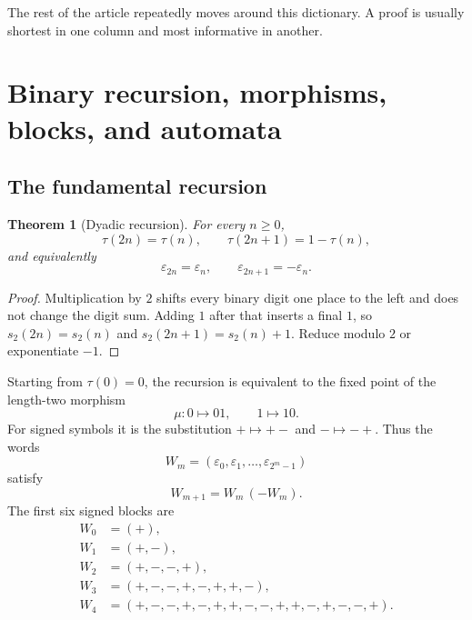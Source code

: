 \documentclass[11pt,oneside]{article}
\newtheorem{theorem}{Theorem}[section]
\theoremstyle{definition}
\theoremstyle{remark}
\newcommand{\bitsum}{s_2}
\newcommand{\eps}{\varepsilon}
\begin{document}
The rest of the article repeatedly moves around this dictionary.  A proof is
usually shortest in one column and most informative in another.

\section{Binary recursion, morphisms, blocks, and automata}

\subsection{The fundamental recursion}

\begin{theorem}[Dyadic recursion]\label{thm:dyadic-recursion}
For every $n\ge0$,
\begin{equation}\label{eq:dyadic-recursion}
 \tau(2n)=\tau(n),\qquad \tau(2n+1)=1-\tau(n),
\end{equation}
and equivalently
\begin{equation}\label{eq:signed-dyadic-recursion}
 \eps_{2n}=\eps_n,\qquad \eps_{2n+1}=-\eps_n.
\end{equation}
\end{theorem}

\begin{proof}
Multiplication by $2$ shifts every binary digit one place to the left and does
not change the digit sum.  Adding $1$ after that inserts a final $1$, so
$\bitsum(2n)=\bitsum(n)$ and $\bitsum(2n+1)=\bitsum(n)+1$.  Reduce modulo $2$
or exponentiate $-1$.
\end{proof}

Starting from $\tau(0)=0$, the recursion is equivalent to the fixed point of
the length-two morphism
\begin{equation}\label{eq:morphism}
  \mu:0\mapsto 01,\qquad 1\mapsto 10.
\end{equation}
For signed symbols it is the substitution $+\mapsto +-$ and
$-\mapsto-+$.  Thus the words
\[
  W_m=(\eps_0,\eps_1,\ldots,\eps_{2^m-1})
\]
satisfy
\begin{equation}\label{eq:block-recursion}
  W_{m+1}=W_m\,(-W_m).
\end{equation}
The first six signed blocks are
\begin{align*}
 W_0&=(+),\\
 W_1&=(+,-),\\
 W_2&=(+,-,-,+),\\
 W_3&=(+,-,-,+,-,+,+,-),\\
 W_4&=(+,-,-,+,-,+,+,-,-,+,+,-,+,-,-,+).
\end{align*}
\end{document}
